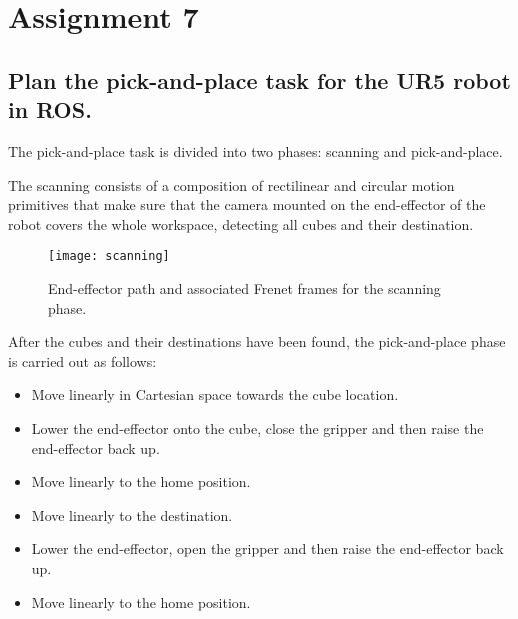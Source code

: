 \section{Assignment 7}

\subsection{Plan the pick-and-place task for the UR5 robot in ROS.}

The pick-and-place task is divided into two phases: scanning and pick-and-place.

The scanning consists of a composition of rectilinear and circular motion primitives that make sure that the camera mounted on the end-effector of the robot covers the whole workspace, detecting all cubes and their destination.

\begin{figure}[h]
\centering
\texttt{[image: scanning]}
\caption{End-effector path and associated Frenet frames for the scanning phase.}
\end{figure}

After the cubes and their destinations have been found, the pick-and-place phase is carried out as follows:

\begin{itemize}
\item Move linearly in Cartesian space towards the cube location.
\item Lower the end-effector onto the cube, close the gripper and then raise the end-effector back up.
\item Move linearly to the home position.
\item Move linearly to the destination.
\item Lower the end-effector, open the gripper and then raise the end-effector back up.
\item Move linearly to the home position.
\end{itemize}
